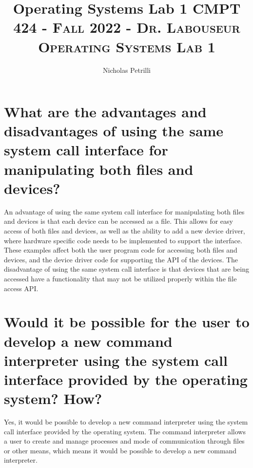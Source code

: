 \documentclass{article}
\title{Operating Systems Lab 1}
\author{Nicholas Petrilli}
\title{	
   \normalfont \normalsize 
   \textsc{CMPT 424 - Fall 2022 - Dr. Labouseur} \\[10pt] %
   \textsc{Operating Systems Lab 1}
}
\begin{document}
\maketitle

\section{What are the advantages and disadvantages of using the same system call interface for manipulating both files and devices?}

\noindent
An advantage of using the same system call interface for manipulating both files and devices is that each device can be accessed as a file. This allows for easy access of both files and devices, as well as the ability to add a new device driver, where hardware specific code needs to be implemented to support the interface. These examples affect both the user program code for accessing both files and devices, and the device driver code for supporting the API of the devices. The disadvantage of using the same system call interface is that devices that are being accessed have a functionality that may not be utilized properly within the file access API.  


\section{Would it be possible for the user to develop a new command interpreter using the system call interface provided by the operating system? How?}

\noindent
Yes, it would be possible to develop a new command interpreter using the system call interface provided by the operating system. The command interpreter allows a user to create and manage processes and mode of communication through files or other means, which means it would be possible to develop a new command interpreter.
\end{document}
